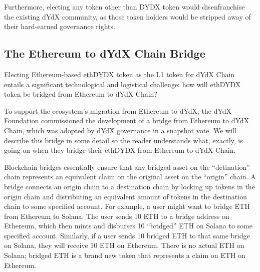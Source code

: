         Furthermore, electing any token other than DYDX token would disenfranchise the existing dYdX community, as those token holders would be stripped away of their hard-earned governance rights. 
        
    \subsection{The Ethereum to dYdX Chain Bridge} \label{subsec:tokentransition}

        Electing Ethereum-based ethDYDX token as the L1 token for dYdX Chain entails a significant technological and logistical challenge: how will ethDYDX token be bridged from Ethereum to dYdX Chain? 

        To support the ecosystem's migration from Ethereum to dYdX, the dYdX Foundation commissioned the development of a bridge from Ethereum to dYdX Chain, which was adopted by dYdX governance in a snapshot vote. We will describe this bridge in some detail so the reader understands what, exactly, is going on when they bridge their ethDYDX from Ethereum to dYdX Chain.

        Blockchain bridges essentially ensure that any bridged asset on the ``detination'' chain represents an equivalent claim on the original asset on the ``origin'' chain. A bridge connects an origin chain to a destination chain by locking up tokens in the origin chain and distributing an equivalent amount of tokens in the destination chain to some specified account. For example, a user might want to bridge ETH from Ethereum to Solana. The user sends 10 ETH to a bridge address on Ethereum, which then mints and disburses 10 ``bridged'' ETH on Solana to some specified account. Similarly, if a user sends 10 bridged ETH to that same bridge on Solana, they will receive 10 ETH on Ethereum. There is no actual ETH on Solana; bridged ETH is a brand new token that represents a claim on ETH on Ethereum.

